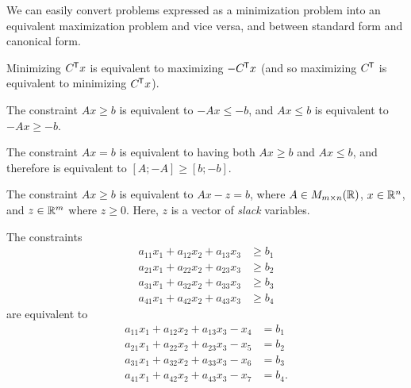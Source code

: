 \begin{rmk}
    We can easily convert problems expressed as a minimization problem into an equivalent maximization problem and vice versa, and between standard form and canonical form.
\end{rmk}

\begin{prop}
    Minimizing $C^{\mkern-1.5mu\mathsf{T}}x$ is equivalent to maximizing $-C^{\mkern-1.5mu\mathsf{T}}x$ (and so maximizing $C^{\mkern-1.5mu\mathsf{T}}$ is equivalent to minimizing $C^{\mkern-1.5mu\mathsf{T}}x$).
\end{prop}

\begin{prop}
    The constraint $Ax \geq b$ is equivalent to $-Ax \leq -b$, and $Ax \leq b$ is equivalent to $-Ax \geq -b$.
\end{prop}

\begin{prop}
    The constraint $Ax = b$ is equivalent to having both $Ax \geq b$ and $Ax \leq b$, and therefore is equivalent to $[A; -A] \geq [b; -b]$.
\end{prop}

\begin{prop}
    The constraint $Ax \geq b$ is equivalent to $Ax - z = b$, where $A \in M_{m \times n}(\mathbb{R})$, $x \in \mathbb{R}^n$, and $z \in \mathbb{R}^m$ where $z \geq 0$. Here, $z$ is a vector of \emph{slack} variables.
\end{prop}

\begin{exmp}
    The constraints
    \begin{align*}
        a_{11}x_1 + a_{12}x_2 + a_{13}x_3 &\geq b_1 \\
        a_{21}x_1 + a_{22}x_2 + a_{23}x_3 &\geq b_2 \\
        a_{31}x_1 + a_{32}x_2 + a_{33}x_3 &\geq b_3 \\
        a_{41}x_1 + a_{42}x_2 + a_{43}x_3 &\geq b_4
    \end{align*}
    are equivalent to
    \begin{align*}
        a_{11}x_1 + a_{12}x_2 + a_{13}x_3 - x_4 &= b_1 \\
        a_{21}x_1 + a_{22}x_2 + a_{23}x_3 - x_5 &= b_2 \\
        a_{31}x_1 + a_{32}x_2 + a_{33}x_3 - x_6 &= b_3 \\
        a_{41}x_1 + a_{42}x_2 + a_{43}x_3 - x_7 &= b_4.
    \end{align*}
\end{exmp}

